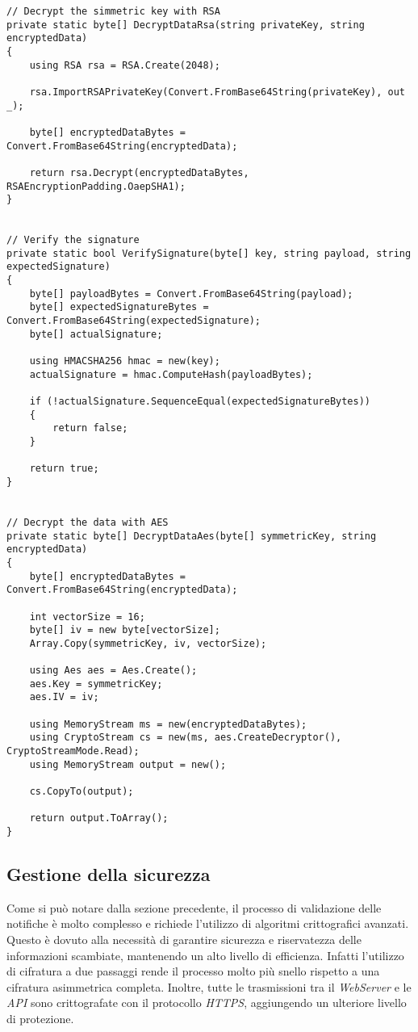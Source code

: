 \begin{lstlisting}[caption=Funzioni per la decifratura delle notifiche, label=lst:decryption-code]
// Decrypt the simmetric key with RSA
private static byte[] DecryptDataRsa(string privateKey, string encryptedData)
{
	using RSA rsa = RSA.Create(2048);

	rsa.ImportRSAPrivateKey(Convert.FromBase64String(privateKey), out _);

	byte[] encryptedDataBytes = Convert.FromBase64String(encryptedData);

	return rsa.Decrypt(encryptedDataBytes, RSAEncryptionPadding.OaepSHA1);
}


// Verify the signature
private static bool VerifySignature(byte[] key, string payload, string expectedSignature)
{
	byte[] payloadBytes = Convert.FromBase64String(payload);
	byte[] expectedSignatureBytes = Convert.FromBase64String(expectedSignature);
	byte[] actualSignature;

	using HMACSHA256 hmac = new(key);
	actualSignature = hmac.ComputeHash(payloadBytes);

	if (!actualSignature.SequenceEqual(expectedSignatureBytes))
	{
		return false;
	}

	return true;
}


// Decrypt the data with AES
private static byte[] DecryptDataAes(byte[] symmetricKey, string encryptedData)
{
	byte[] encryptedDataBytes = Convert.FromBase64String(encryptedData);

	int vectorSize = 16;
	byte[] iv = new byte[vectorSize];
	Array.Copy(symmetricKey, iv, vectorSize);

	using Aes aes = Aes.Create();
	aes.Key = symmetricKey;
	aes.IV = iv;

	using MemoryStream ms = new(encryptedDataBytes);
	using CryptoStream cs = new(ms, aes.CreateDecryptor(), CryptoStreamMode.Read);
	using MemoryStream output = new();

	cs.CopyTo(output);

	return output.ToArray();
}
\end{lstlisting}

\bigskip

\subsection{Gestione della sicurezza}

Come si può notare dalla sezione precedente, il processo di validazione delle notifiche è molto complesso e richiede l'utilizzo di algoritmi crittografici avanzati.
Questo è dovuto alla necessità di garantire sicurezza e riservatezza delle informazioni scambiate, mantenendo un alto livello di efficienza.
Infatti l'utilizzo di cifratura a due passaggi rende il processo molto più snello rispetto a una cifratura asimmetrica completa.
Inoltre, tutte le trasmissioni tra il \emph{WebServer} e le \emph{API} sono crittografate con il protocollo \emph{HTTPS}, aggiungendo un ulteriore livello di protezione.


